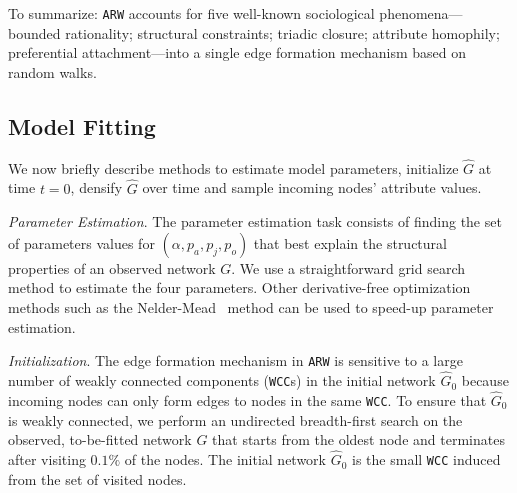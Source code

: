 To summarize: \texttt{ARW} accounts for five well-known sociological phenomena---bounded rationality; structural constraints; triadic closure; attribute homophily; preferential attachment---into a single edge
formation mechanism based on random walks. 




\subsection{Model Fitting}
\label{sub:Model Fitting}

We now briefly describe methods to estimate model parameters,
initialize $\hat{G}$ at time ${t=0}$, densify $\hat{G}$
over time and sample incoming nodes' attribute values.

\textit{Parameter Estimation}.
The parameter estimation task consists of finding the set of
parameters values for $(\alpha, p_a, p_j, p_o)$ that best explain the structural properties
of an observed network $G$. We use a straightforward grid search method to estimate
the four parameters. Other derivative-free optimization methods such as the Nelder-Mead~\cite{nelder1965simplex}
method can be used to speed-up parameter estimation.

\textit{Initialization}. The edge formation mechanism in \texttt{ARW} is
sensitive to a large number of weakly connected components (\texttt{WCC}s) in the
initial network $\hat{G}_0$ because incoming nodes can only form edges to nodes
in the same \texttt{WCC}. To ensure that $\hat{G}_0$ is weakly
connected, we perform an undirected breadth-first search on the observed,
to-be-fitted network $G$ that starts from the oldest node and terminates after
visiting $0.1\%$ of the nodes. The initial network $\hat{G}_0$ is the small \texttt{WCC}
induced from the set of visited nodes.


